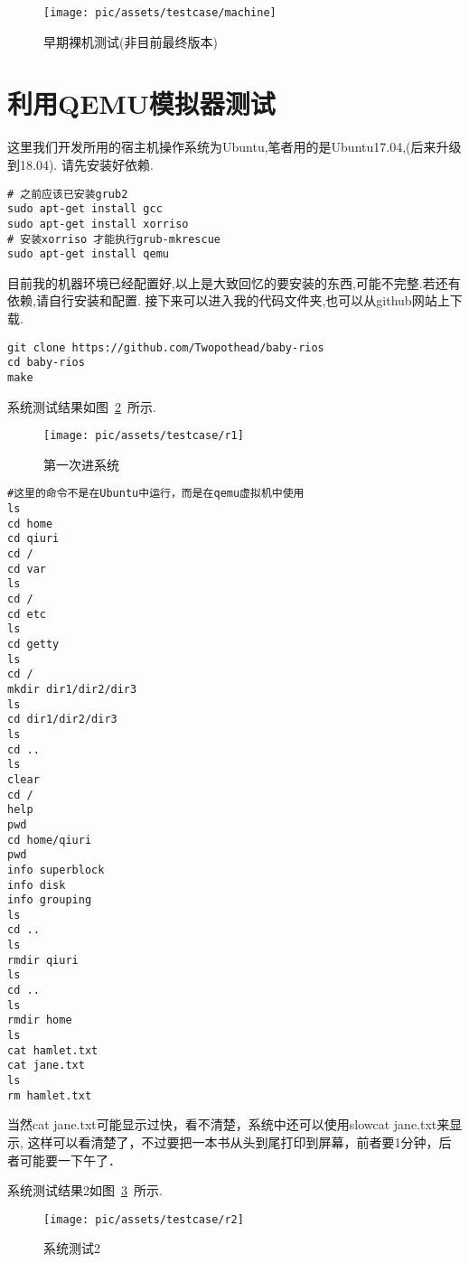 \begin{figure}[!htbp]
    \centering	\texttt{[image: pic/assets/testcase/machine]}
    \caption{早期裸机测试(非目前最终版本)}	\label{machine}	\end{figure}

\section{利用QEMU模拟器测试}

这里我们开发所用的宿主机操作系统为Ubuntu,笔者用的是Ubuntu17.04,(后来升级到18.04).
请先安装好依赖.
\begin{verbatim}
# 之前应该已安装grub2
sudo apt-get install gcc
sudo apt-get install xorriso
# 安装xorriso 才能执行grub-mkrescue
sudo apt-get install qemu
\end{verbatim}

目前我的机器环境已经配置好,以上是大致回忆的要安装的东西,可能不完整.若还有依赖,请自行安装和配置.
接下来可以进入我的代码文件夹,也可以从github网站上下载.

\begin{verbatim}
git clone https://github.com/Twopothead/baby-rios
cd baby-rios
make
\end{verbatim}

系统测试结果如图~\ref{r1}~所示.

\begin{figure}[!htbp]
    \centering	\texttt{[image: pic/assets/testcase/r1]}
    \caption{第一次进系统}	\label{r1}	\end{figure}

\begin{verbatim}
#这里的命令不是在Ubuntu中运行，而是在qemu虚拟机中使用
ls
cd home
cd qiuri
cd /
cd var
ls 
cd /
cd etc
ls
cd getty
ls
cd /
mkdir dir1/dir2/dir3
ls
cd dir1/dir2/dir3
ls
cd ..
ls
clear
cd /
help
pwd
cd home/qiuri
pwd
info superblock
info disk
info grouping
ls
cd ..
ls
rmdir qiuri
ls
cd ..
ls
rmdir home
ls
cat hamlet.txt
cat jane.txt
ls
rm hamlet.txt
\end{verbatim}

当然cat jane.txt可能显示过快，看不清楚，系统中还可以使用slowcat jane.txt来显示,
这样可以看清楚了，不过要把一本书从头到尾打印到屏幕，前者要1分钟，后者可能要一下午了．

系统测试结果2如图~\ref{r2}~所示.

\begin{figure}[!htbp]
    \centering	\texttt{[image: pic/assets/testcase/r2]}
    \caption{系统测试2}	\label{r2}	\end{figure}


